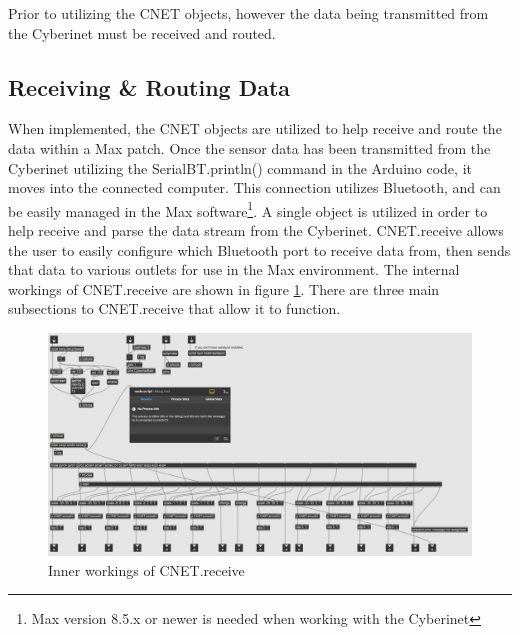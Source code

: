 Prior to utilizing the CNET objects, however the data being transmitted from the Cyberinet must be received and routed.



\subsection{Receiving \& Routing Data}

When implemented, the CNET objects are utilized to help receive and route the data within a Max patch. Once the sensor data has been transmitted from the Cyberinet utilizing the SerialBT.println() command in the Arduino code, it moves into the connected computer. This connection utilizes Bluetooth, and can be easily managed in the Max software\footnote{Max version 8.5.x or newer is needed when working with the Cyberinet}. A single object is utilized in order to help receive and parse the data stream from the Cyberinet. CNET.receive allows the user to easily configure which Bluetooth port to receive data from, then sends that data to various outlets for use in the Max environment. The internal workings of CNET.receive are shown in figure \ref{fig:cnet.receive}. There are three main subsections to CNET.receive that allow it to function.


\begin{center}
    \begin{figure}
        \centering
        \includegraphics[scale=0.48, angle=270]{diagrams/maxPatches/CNET.receive.png}
        \caption{Inner workings of CNET.receive}
        \label{fig:cnet.receive}
    \end{figure}
\end{center}

